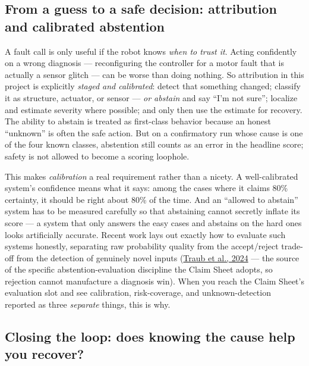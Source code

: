 \documentclass[12pt]{article}
\begin{document}
\subsection{From a guess to a safe decision: attribution and calibrated abstention}

A fault call is only useful if the robot knows \emph{when to trust it}. Acting confidently on a wrong diagnosis --- reconfiguring the controller for a motor fault that is actually a sensor glitch --- can be worse than doing nothing. So attribution in this project is explicitly \emph{staged and calibrated}: detect that something changed; classify it as structure, actuator, or sensor --- \emph{or abstain} and say ``I'm not sure''; localize and estimate severity where possible; and only then use the estimate for recovery. The ability to abstain is treated as first-class behavior because an honest ``unknown'' is often the safe action. But on a confirmatory run whose cause is one of the four known classes, abstention still counts as an error in the headline score; safety is not allowed to become a scoring loophole.

This makes \emph{calibration} a real requirement rather than a nicety. A well-calibrated system's confidence means what it says: among the cases where it claims 80\% certainty, it should be right about 80\% of the time. And an ``allowed to abstain'' system has to be measured carefully so that abstaining cannot secretly inflate its score --- a system that only answers the easy cases and abstains on the hard ones looks artificially accurate. Recent work lays out exactly how to evaluate such systems honestly, separating raw probability quality from the accept/reject trade-off from the detection of genuinely novel inputs (\href{https://papers.nips.cc/paper_files/paper/2024/hash/047c84ec50bd8ea29349b996fc64af4b-Abstract-Conference.html}{Traub et al., 2024} --- the source of the specific abstention-evaluation discipline the Claim Sheet adopts, so rejection cannot manufacture a diagnosis win). When you reach the Claim Sheet's evaluation slot and see calibration, risk-coverage, and unknown-detection reported as three \emph{separate} things, this is why.

\subsection{Closing the loop: does knowing the cause help you recover?}
\end{document}
